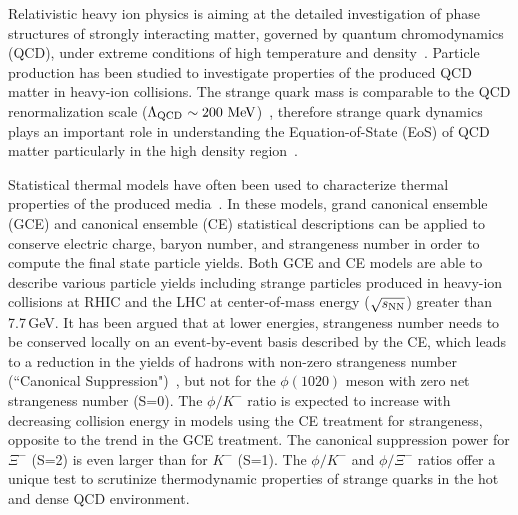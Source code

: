 \documentclass[%
 reprint,	
showpacs,
 amsmath,amssymb,
 aps,
 superscriptaddress,
]{revtex4-1}
\begin{document}
\maketitle


Relativistic heavy ion physics is aiming at the detailed investigation of phase structures of strongly interacting matter, governed by quantum chromodynamics (QCD), under extreme conditions of high temperature and density~\cite{akiba2015hot,Busza_ARNPS,StarWhitePaper}. Particle production has been studied to investigate properties of the produced QCD matter in heavy-ion collisions. The strange quark mass is comparable to the QCD renormalization scale ($\Lambda_{\rm{QCD}}$\,$\sim\textup{200 MeV}$)~\cite{Rafelski:1982pu,Koch:1986ud}, 
therefore strange quark dynamics plays an important role in understanding the Equation-of-State (EoS) of QCD matter particularly in the high density region~\cite{KO_sQM17,Danielewicz1592,Tetyana_ICNN,KO.PhysRevLett.55.2661,Ks0_Lambda_HADES,CASSING.openCharm.2001753}. 

Statistical thermal models have often been used to characterize thermal properties of the produced media~\cite{Andronic_2018Naure,Rafelski_1980279,Cleymans:1992zc,Becattini:1997ii,Florkowski:2001fp,Redlich_CE,Rafelski_PRC}. In these models, grand canonical ensemble (GCE) and canonical ensemble (CE) statistical descriptions can be applied to conserve electric charge, baryon number, and strangeness number in order to compute the final state particle yields. Both GCE and CE models are able to describe various particle yields including strange particles produced in heavy-ion collisions at RHIC and the LHC at center-of-mass energy ($\sqrt{s_{\rm NN}}$) greater than 7.7\,GeV. It has been argued that at lower energies, strangeness number needs to be conserved locally on an event-by-event basis described by the CE, which leads to a reduction in the yields of hadrons with non-zero strangeness number (``Canonical Suppression")~\cite{Rafelski_1980279,Rafelski_2002,Redlich:2001kb}, but not for the $\phi(1020)$ meson with zero net strangeness number (S=0). The $\phi/K^-$ ratio is expected to increase with decreasing collision energy in models using the CE treatment for strangeness, opposite to the trend in the GCE treatment. The canonical suppression power for $\Xi^-$ (S=2) is even larger than for $K^-$ (S=1). The $\phi/K^-$ and $\phi/\Xi^-$ ratios offer a unique test to scrutinize thermodynamic properties of strange quarks in the hot and dense QCD environment.
\end{document}
